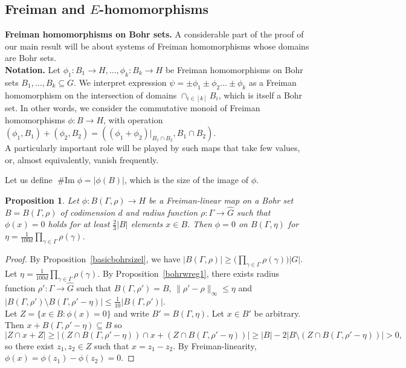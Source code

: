 \documentclass[a4paper,11pt]{article}
\numberwithin{theorem}{section}
\newtheorem{proposition}[theorem]{Proposition}
\theoremstyle{definition}
\newcommand{\on}[1]{
	\operatorname{#1}
}
\newcommand\range{\on{\# Im}}
\begin{document}
\subsection{Freiman and $E$-homomorphisms} 

\noindent \textbf{Freiman homomorphisms on Bohr sets.} A considerable part of the proof of our main result will be about systems of Freiman homomorphisms whose domains are Bohr sets.\\

\noindent\textbf{Notation.} Let $\phi_1 : B_1 \to H, \dots, \phi_k : B_k \to H$ be Freiman homomorphisms on Bohr sets $B_1, \dots, B_k \subseteq G$. We interpret expression $\psi = \pm \phi_1 \pm \phi_2 \dots \pm \phi_k$ as a Freiman homomorphism on the intersection of domains $\cap_{i \in [k]} B_i$, which is itself a Bohr set. In other words, we consider the commutative monoid of Freiman homomorphisms $\phi : B \to H$, with operation $(\phi_1, B_1) + (\phi_2, B_2) = ((\phi_1 + \phi_2)|_{B_1 \cap B_2}, B_1 \cap B_2)$.\\

A particularly important role will be played by such maps that take few values, or, almost equivalently, vanish frequently.

Let us define $\range \phi = |\phi(B)|$, which is the size of the image of $\phi$.

\begin{proposition}Let $\phi : B(\Gamma, \rho) \to H$ be a Freiman-linear map on a Bohr set $B = B(\Gamma, \rho)$ of codimension $d$ and radius function $\rho : \Gamma \to \hat{G}$ such that $\phi(x) = 0$ holds for at least $\frac{2}{3}|B|$ elements $x \in B$. Then $\phi = 0$ on $ B(\Gamma, \eta) $ for $\eta = \frac{1}{100d} \prod_{\gamma \in \Gamma} \rho(\gamma)$.
\end{proposition}

\begin{proof}
    By Proposition~\ref{basicbohrsizel}, we have $|B(\Gamma, \rho)| \geq \Big(\prod_{\gamma \in \Gamma} \rho(\gamma) \Big)|G|$. Let $\eta = \frac{1}{100d} \prod_{\gamma \in \Gamma} \rho(\gamma)$. By Proposition~\ref{bohrwreg1}, there exists radius function $\rho' : \Gamma \to \hat{G}$ such that $B(\Gamma, \rho') = B$, $\|\rho' - \rho\|_\infty \leq \eta$ and $|B(\Gamma, \rho') \setminus B(\Gamma, \rho' - \eta)| \leq \frac{1}{10}|B(\Gamma, \rho')|$.\\
    
    Let $Z = \{x \in B : \phi(x) = 0 \}$ and write $B' = B(\Gamma, \eta)$. Let $x \in B'$ be arbitrary. Then $x + B(\Gamma, \rho' - \eta) \subseteq B$ so 
    \[|Z \cap x + Z| \geq |(Z \cap B(\Gamma, \rho' - \eta)) \cap x + (Z \cap B(\Gamma, \rho' - \eta))| \geq |B| - 2|B \setminus (Z \cap B(\Gamma, \rho' - \eta))| > 0,\]
    so there exist $z_1, z_2 \in Z$ such that $x = z_1 - z_2$. By Freiman-linearity, $\phi(x) = \phi(z_1) - \phi(z_2) = 0$.
\end{proof}
\end{document}
